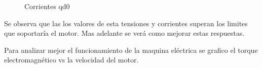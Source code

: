 \documentclass[a4paper, 10pt, onecolumn,journal]{ieeeconf}
\begin{document}
\begin{figure}[H]
	\centering
	\begin{adjustbox}{max width=\columnwidth}
	\end{adjustbox}
	\caption{Corrientes qd0}
	\label{Corrientes qd0}
\end{figure}
Se observa que las los valores de esta tensiones y corrientes superan los limites que soportaría el motor. Mas adelante se verá como mejorar estas respuestas.

Para analizar mejor el funcionamiento de la maquina eléctrica se grafico el torque electromagnético vs la velocidad del motor. 
\end{document}

